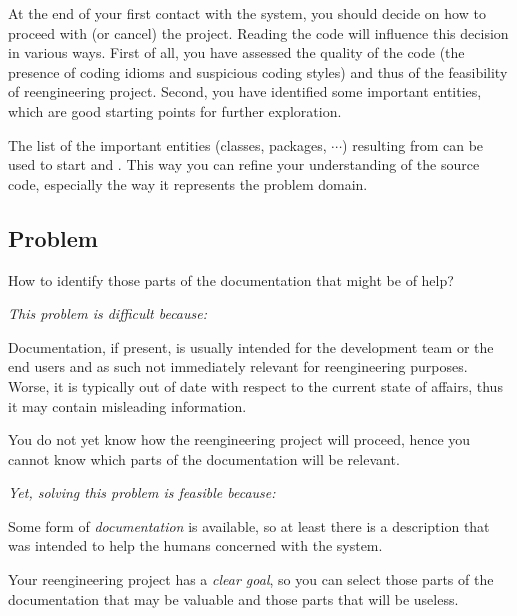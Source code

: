 \documentclass[a4paper,10pt,twoside]{book}
\begin{document}
At the end of your first contact with the system, you should decide on how to proceed with (or cancel) the project. Reading the code will influence this decision in various ways. First of all, you have assessed the quality of the code (\ie the presence of coding idioms and suspicious coding styles) and thus of the feasibility of reengineering project. Second, you have identified some important entities, which are good starting points for further exploration. 

The list of the important entities (\ie classes, packages, $\cdots$) resulting from  can be used to start  and . This way you can refine your understanding of the source code, especially the way it represents the problem domain.



\subsection*{Problem}

How to identify those parts of the documentation that might be of help?

\emph{This problem is difficult because:}

\begin{bulletlist}
  \item Documentation, if present, is usually intended for the development team or the end users and as such not immediately relevant for reengineering purposes. Worse, it is typically out of date with respect to the current state of affairs, thus it may contain misleading information.

  \item You do not yet know how the reengineering project will proceed, hence you cannot know which parts of the documentation will be relevant.
\end{bulletlist}


\emph{Yet, solving this problem is feasible because:}

\begin{bulletlist}
  \item Some form of \emph{documentation} is available, so at least there is a description that was intended to help the humans concerned with the system.

  \item Your reengineering project has a \emph{clear goal}, so you can select those parts of the documentation that may be valuable and those parts that will be useless.

\end{bulletlist}
\end{document}
